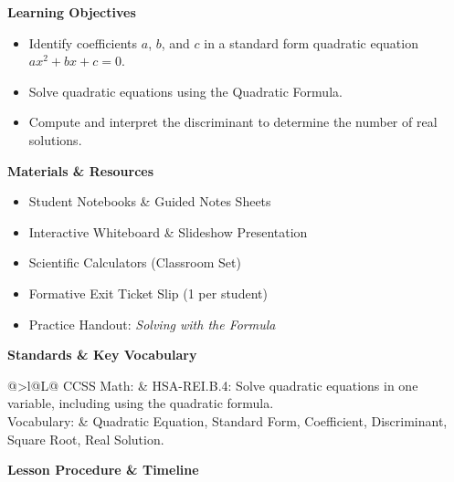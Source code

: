 \documentclass[10pt]{article}
\newcommand{\sectiontitle}[1]{{\color{brandnavy}\fontsize{12pt}{14pt}\bfseries\sffamily #1}\par}
\begin{document}
\begin{minipage}[t]{0.48\linewidth}
    \sectiontitle{Learning Objectives}
    \vspace{4pt}
    \begin{itemize}
        \item Identify coefficients $a$, $b$, and $c$ in a standard form quadratic equation $ax^2 + bx + c = 0$.
        \item Solve quadratic equations using the Quadratic Formula.
        \item Compute and interpret the discriminant to determine the number of real solutions.
    \end{itemize}
\end{minipage}\hfill
\begin{minipage}[t]{0.48\linewidth}
    \sectiontitle{Materials \& Resources}
    \vspace{4pt}
    \begin{itemize}
        \item Student Notebooks \& Guided Notes Sheets
        \item Interactive Whiteboard \& Slideshow Presentation
        \item Scientific Calculators (Classroom Set)
        \item Formative Exit Ticket Slip (1 per student)
        \item Practice Handout: \textit{Solving with the Formula}
    \end{itemize}
\end{minipage}

\vspace{12pt}
\sectiontitle{Standards \& Key Vocabulary}
\vspace{4pt}
\begin{tabularx}{\linewidth}{@{}>{\color{brandblue}\bfseries}l@{\hspace{6mm}}L@{}}
CCSS Math: & HSA-REI.B.4: Solve quadratic equations in one variable, including using the quadratic formula.\\
Vocabulary: & Quadratic Equation, Standard Form, Coefficient, Discriminant, Square Root, Real Solution.\\
\end{tabularx}

\vspace{12pt}

\sectiontitle{Lesson Procedure \& Timeline}
\vspace{4pt}
\end{document}
